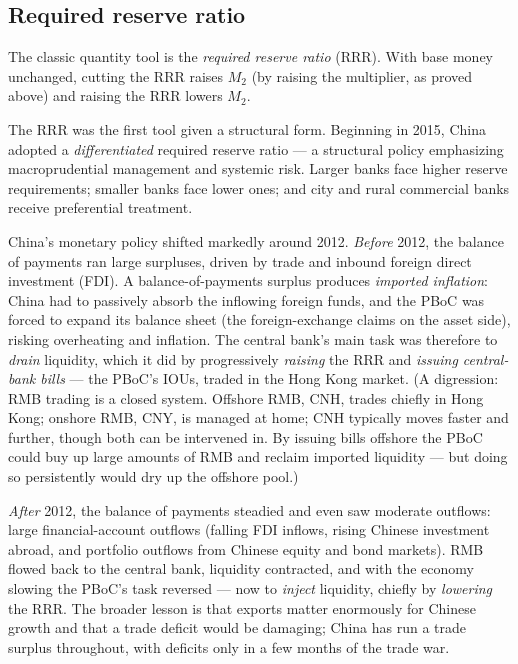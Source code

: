 \subsection{Required reserve ratio}

The classic quantity tool is the \emph{required reserve ratio} (RRR). With base money unchanged, cutting the RRR raises $M_2$ (by raising the multiplier, as proved above) and raising the RRR lowers $M_2$.

\begin{remark}
The RRR was the first tool given a structural form. Beginning in 2015, China adopted a \emph{differentiated} required reserve ratio --- a structural policy emphasizing macroprudential management and systemic risk. Larger banks face higher reserve requirements; smaller banks face lower ones; and city and rural commercial banks receive preferential treatment.
\end{remark}

\begin{remark}
China's monetary policy shifted markedly around 2012. \emph{Before} 2012, the balance of payments ran large surpluses, driven by trade and inbound foreign direct investment (FDI). A balance-of-payments surplus produces \emph{imported inflation}: China had to passively absorb the inflowing foreign funds, and the PBoC was forced to expand its balance sheet (the foreign-exchange claims on the asset side), risking overheating and inflation. The central bank's main task was therefore to \emph{drain} liquidity, which it did by progressively \emph{raising} the RRR and \emph{issuing central-bank bills} --- the PBoC's IOUs, traded in the Hong Kong market. (A digression: RMB trading is a closed system. Offshore RMB, CNH, trades chiefly in Hong Kong; onshore RMB, CNY, is managed at home; CNH typically moves faster and further, though both can be intervened in. By issuing bills offshore the PBoC could buy up large amounts of RMB and reclaim imported liquidity --- but doing so persistently would dry up the offshore pool.)

\emph{After} 2012, the balance of payments steadied and even saw moderate outflows: large financial-account outflows (falling FDI inflows, rising Chinese investment abroad, and portfolio outflows from Chinese equity and bond markets). RMB flowed back to the central bank, liquidity contracted, and with the economy slowing the PBoC's task reversed --- now to \emph{inject} liquidity, chiefly by \emph{lowering} the RRR. The broader lesson is that exports matter enormously for Chinese growth and that a trade deficit would be damaging; China has run a trade surplus throughout, with deficits only in a few months of the trade war.
\end{remark}


